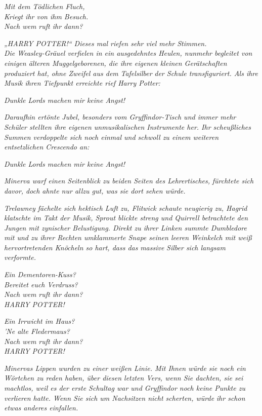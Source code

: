 {\emph{Mit dem Tödlichen Fluch,\\ Kriegt ihr von ihm Besuch.\\ Nach wem ruft ihr dann?}

\hfill\break \emph{„HARRY POTTER!“ Dieses mal riefen sehr viel mehr Stimmen.}\\ \emph{Die Weasley-Gräuel verfielen in ein ausgedehntes Heulen, nunmehr begleitet von einigen älteren Muggelgeborenen, die ihre eigenen kleinen Gerätschaften produziert hat, ohne Zweifel aus dem} \emph{Tafelsilber} \emph{der Schule transfiguriert. Als ihre Musik ihren Tiefpunkt erreichte rief Harry Potter:}

\emph{\emph{{Dunkle Lords machen mir keine Angst!}}}

\emph{Daraufhin ertönte Jubel, besonders vom Gryffindor-Tisch und immer mehr Schüler stellten ihre eigenen unmusikalischen Instrumente her. Ihr scheußliches Summen verdoppelte sich noch einmal und schwoll zu einem weiteren entsetzlichen Crescendo an:}

\emph{\emph{{Dunkle Lords machen mir keine Angst!}}}

\emph{Minerva warf einen Seitenblick zu beiden Seiten des Lehrertisches,} \emph{fürchtete sich davor, doch ahnte nur allzu gut, was sie dort sehen würde.}

\emph{Trelawney fächelte sich hektisch Luft zu, Flitwick schaute neugierig zu, Hagrid klatschte im Takt der Musik, Sprout blickte streng und Quirrell betrachtete den Jungen mit zynischer Belustigung. Direkt zu ihrer Linken summte Dumbledore mit und zu ihrer Rechten umklammerte Snape seinen leeren Weinkelch mit weiß hervortretenden Knöcheln so hart, dass das} \emph{massive} \emph{Silber sich langsam verformte.}

\emph{Ein Dementoren-Kuss?\\ Bereitet euch Verdruss?\\ Nach wem ruft ihr dann?\\ HARRY POTTER!}

\hfill\break

\emph{Ein Irrwicht im Haus?\\ 'Ne alte Fledermaus?\\ Nach wem ruft ihr dann?\\ HARRY POTTER!}

\hfill\break \emph{Minervas Lippen wurden zu einer weißen Linie. Mit Ihnen würde sie noch ein Wörtchen zu reden haben, über diesen letzten Vers, wenn Sie dachten, sie sei machtlos, weil es der erste Schultag war und Gryffindor noch keine Punkte zu verlieren hatte. Wenn Sie sich um Nachsitzen nicht scherten, würde} \emph{ihr schon etwas anderes einfallen.}

}
